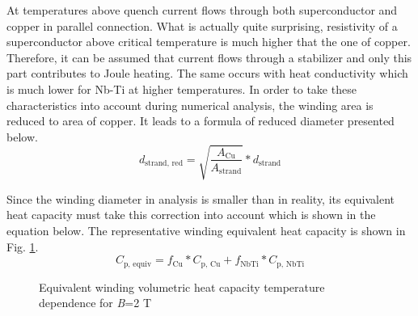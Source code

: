 \documentclass{article}
\begin{document}
At temperatures above quench current flows through both superconductor and copper in parallel connection. What is actually quite surprising, resistivity of a superconductor above critical temperature is much higher that the one of copper. Therefore, it can be assumed that current flows through a stabilizer and only this part contributes to Joule heating. The same occurs with heat conductivity which is much lower for Nb-Ti at higher temperatures. In order to take these characteristics into account during numerical analysis, the winding area is reduced to area of copper. It leads to a formula of reduced diameter presented below.
\begin{equation}
    d_\text{strand, red} = \sqrt{\frac{A_\text{Cu}}{A_\text{strand}}}*d_\text{strand}
\end{equation}

Since the winding diameter in analysis is smaller than in reality, its equivalent heat capacity must take this correction into account which is shown in the equation below. The representative winding equivalent heat capacity is shown in Fig. \ref{fig:eq_wind_cp}.
\begin{equation}
    C_\text{p, equiv} = f_\text{Cu}*C_\text{p, Cu} + f_\text{NbTi}*C_\text{p, NbTi}
\end{equation}
 
\begin{figure}[h!]
\centering
{}
\caption{Equivalent winding volumetric heat capacity temperature dependence for \textit{B}=2 T}
    \label{fig:eq_wind_cp}
\end{figure}
 
 
 
\end{document}
